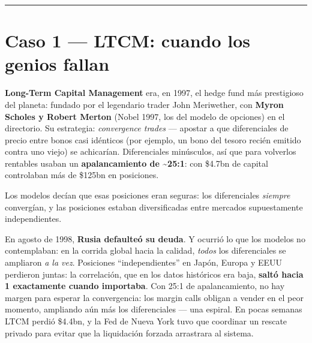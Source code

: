 \documentclass[
  spanish,
  letterpaper,
  DIV=11,
  numbers=noendperiod]{scrreprt}
\begin{document}
\begin{center}\rule{0.5\linewidth}{0.5pt}\end{center}

\chapter{Caso 1 --- LTCM: cuando los genios
fallan}\label{caso-1-ltcm-cuando-los-genios-fallan}

\textbf{Long-Term Capital Management} era, en 1997, el hedge fund más
prestigioso del planeta: fundado por el legendario trader John
Meriwether, con \textbf{Myron Scholes y Robert Merton} (Nobel 1997, los
del modelo de opciones) en el directorio. Su estrategia:
\emph{convergence trades} --- apostar a que diferenciales de precio
entre bonos casi idénticos (por ejemplo, un bono del tesoro recién
emitido contra uno viejo) se achicarían. Diferenciales minúsculos, así
que para volverlos rentables usaban un \textbf{apalancamiento de
\textasciitilde25:1}: con \$4.7bn de capital controlaban más de \$125bn
en posiciones.

Los modelos decían que esas posiciones eran seguras: los diferenciales
\emph{siempre} convergían, y las posiciones estaban diversificadas entre
mercados supuestamente independientes.

En agosto de 1998, \textbf{Rusia defaulteó su deuda}. Y ocurrió lo que
los modelos no contemplaban: en la corrida global hacia la calidad,
\emph{todos} los diferenciales se ampliaron \emph{a la vez}. Posiciones
``independientes'' en Japón, Europa y EEUU perdieron juntas: la
correlación, que en los datos históricos era baja, \textbf{saltó hacia 1
exactamente cuando importaba}. Con 25:1 de apalancamiento, no hay margen
para esperar la convergencia: los margin calls obligan a vender en el
peor momento, ampliando aún más los diferenciales --- una espiral. En
pocas semanas LTCM perdió \$4.4bn, y la Fed de Nueva York tuvo que
coordinar un rescate privado para evitar que la liquidación forzada
arrastrara al sistema.
\end{document}
